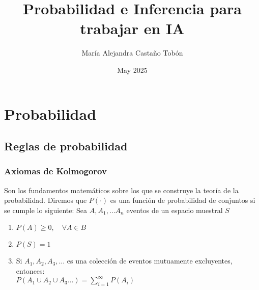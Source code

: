\documentclass{report}
\title{Probabilidad e Inferencia para trabajar en IA}
\author{María Alejandra Castaño Tobón}
\date{May 2025}
\begin{document}
\chapter{Probabilidad}

\iffalse
\section{Conceptos básicos}
\begin{itemize}
    \item\textbf{Espacio muestral} 
    El conjunto de todos los resultados posibles de un experimento se le llama espacio muestral y se representa con el símbolo \(S\). En algunos textos se usa el símbolo \(C\)
    \item\textbf{Complemento}
    El complemento de un evento \(A\) respecto de \(S\) es el subconjunto de todos los elementos de \(S\)
    que no están en \(A\). Se denota mediante el símbolo \(A'\) o \(A^c\)
\end{itemize}
\subsection{Algunas propiedades sobre los eventos}
Sean A, B y C eventos de \(S\). Entonces
\begin{itemize}

    \item\textbf{Leyes de DeMorgan}
    (Generalizable a infinitos eventos):
    \\
    \((A \cap B)' = A'  \cup B'\)
    \\
    \((A \cup B)' = A' \cap B'\)
\end{itemize}


\fi
\section{Reglas de probabilidad}
\subsection{Axiomas de Kolmogorov}
Son los fundamentos matemáticos sobre los que se construye la teoría de la probabilidad.  
Diremos que \(P( \cdot)\) es una función de probabilidad de conjuntos si se cumple lo siguiente: 
Sea \(A, A_1, \dots A_n\) eventos de un espacio muestral \(S\)
\\
\begin{enumerate}[label=\Roman*.]
  \item \(P(A) \geq 0, \quad \forall A \in B\)
  \item \(P(S)= 1\)
  \item Si \(A_1, A_2, A_3, \dots\) es una colección de eventos mutuamente excluyentes, entonces:\\
  \(P(A_1 \cup A_2 \cup A_3 \dots ) = \sum_{i=1}^{\infty} P(A_i)\)
\end{enumerate}
\end{document}
